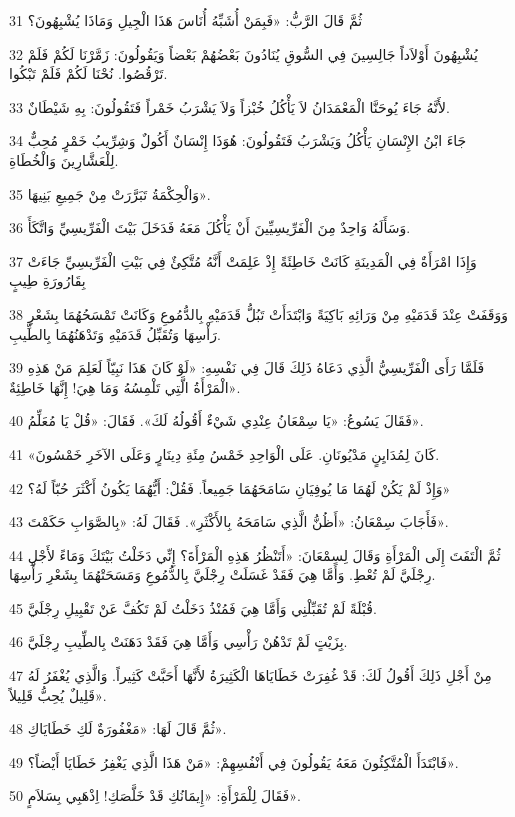 \par 31 ثُمَّ قَالَ الرَّبُّ: «فَبِمَنْ أُشَبِّهُ أُنَاسَ هَذَا الْجِيلِ وَمَاذَا يُشْبِهُونَ؟
\par 32 يُشْبِهُونَ أَوْلاَداً جَالِسِينَ فِي السُّوقِ يُنَادُونَ بَعْضُهُمْ بَعْضاً وَيَقُولُونَ: زَمَّرْنَا لَكُمْ فَلَمْ تَرْقُصُوا. نُحْنَا لَكُمْ فَلَمْ تَبْكُوا.
\par 33 لأَنَّهُ جَاءَ يُوحَنَّا الْمَعْمَدَانُ لاَ يَأْكُلُ خُبْزاً وَلاَ يَشْرَبُ خَمْراً فَتَقُولُونَ: بِهِ شَيْطَانٌ.
\par 34 جَاءَ ابْنُ الإِنْسَانِ يَأْكُلُ وَيَشْرَبُ فَتَقُولُونَ: هُوَذَا إِنْسَانٌ أَكُولٌ وَشِرِّيبُ خَمْرٍ مُحِبٌّ لِلْعَشَّارِينَ وَالْخُطَاةِ.
\par 35 وَالْحِكْمَةُ تَبَرَّرَتْ مِنْ جَمِيعِ بَنِيهَا».
\par 36 وَسَأَلَهُ وَاحِدٌ مِنَ الْفَرِّيسِيِّينَ أَنْ يَأْكُلَ مَعَهُ فَدَخَلَ بَيْتَ الْفَرِّيسِيِّ وَاتَّكَأَ.
\par 37 وَإِذَا امْرَأَةٌ فِي الْمَدِينَةِ كَانَتْ خَاطِئَةً إِذْ عَلِمَتْ أَنَّهُ مُتَّكِئٌ فِي بَيْتِ الْفَرِّيسِيِّ جَاءَتْ بِقَارُورَةِ طِيبٍ
\par 38 وَوَقَفَتْ عِنْدَ قَدَمَيْهِ مِنْ وَرَائِهِ بَاكِيَةً وَابْتَدَأَتْ تَبُلُّ قَدَمَيْهِ بِالدُّمُوعِ وَكَانَتْ تَمْسَحُهُمَا بِشَعْرِ رَأْسِهَا وَتُقَبِّلُ قَدَمَيْهِ وَتَدْهَنُهُمَا بِالطِّيبِ.
\par 39 فَلَمَّا رَأَى الْفَرِّيسِيُّ الَّذِي دَعَاهُ ذَلِكَ قَالَ فِي نَفْسِهِ: «لَوْ كَانَ هَذَا نَبِيّاً لَعَلِمَ مَنْ هَذِهِ الْمَرْأَةُ الَّتِي تَلْمِسُهُ وَمَا هِيَ! إِنَّهَا خَاطِئِةٌ».
\par 40 فَقَالَ يَسُوعُ: «يَا سِمْعَانُ عِنْدِي شَيْءٌ أَقُولُهُ لَكَ». فَقَالَ: «قُلْ يَا مُعَلِّمُ».
\par 41 «كَانَ لِمُدَايِنٍ مَدْيُونَانِ. عَلَى الْوَاحِدِ خَمْسُ مِئَةِ دِينَارٍ وَعَلَى الآخَرِ خَمْسُونَ.
\par 42 وَإِذْ لَمْ يَكُنْ لَهُمَا مَا يُوفِيَانِ سَامَحَهُمَا جَمِيعاً. فَقُلْ: أَيُّهُمَا يَكُونُ أَكْثَرَ حُبّاً لَهُ؟»
\par 43 فَأَجَابَ سِمْعَانُ: «أَظُنُّ الَّذِي سَامَحَهُ بِالأَكْثَرِ». فَقَالَ لَهُ: «بِالصَّوَابِ حَكَمْتَ».
\par 44 ثُمَّ الْتَفَتَ إِلَى الْمَرْأَةِ وَقَالَ لِسِمْعَانَ: «أَتَنْظُرُ هَذِهِ الْمَرْأَةَ؟ إِنِّي دَخَلْتُ بَيْتَكَ وَمَاءً لأَجْلِ رِجْلَيَّ لَمْ تُعْطِ. وَأَمَّا هِيَ فَقَدْ غَسَلَتْ رِجْلَيَّ بِالدُّمُوعِ وَمَسَحَتْهُمَا بِشَعْرِ رَأْسِهَا.
\par 45 قُبْلَةً لَمْ تُقَبِّلْنِي وَأَمَّا هِيَ فَمُنْذُ دَخَلْتُ لَمْ تَكُفَّ عَنْ تَقْبِيلِ رِجْلَيَّ.
\par 46 بِزَيْتٍ لَمْ تَدْهُنْ رَأْسِي وَأَمَّا هِيَ فَقَدْ دَهَنَتْ بِالطِّيبِ رِجْلَيَّ.
\par 47 مِنْ أَجْلِ ذَلِكَ أَقُولُ لَكَ: قَدْ غُفِرَتْ خَطَايَاهَا الْكَثِيرَةُ لأَنَّهَا أَحَبَّتْ كَثِيراً. وَالَّذِي يُغْفَرُ لَهُ قَلِيلٌ يُحِبُّ قَلِيلاً».
\par 48 ثُمَّ قَالَ لَهَا: «مَغْفُورَةٌ لَكِ خَطَايَاكِ».
\par 49 فَابْتَدَأَ الْمُتَّكِئُونَ مَعَهُ يَقُولُونَ فِي أَنْفُسِهِمْ: «مَنْ هَذَا الَّذِي يَغْفِرُ خَطَايَا أَيْضاً؟».
\par 50 فَقَالَ لِلْمَرْأَةِ: «إِيمَانُكِ قَدْ خَلَّصَكِ! اِذْهَبِي بِسَلاَمٍ».

